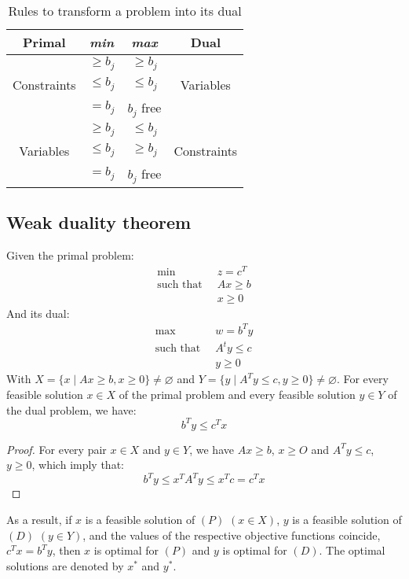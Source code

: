 \begin{table}[H]
    \centering
    \begin{tabular}{c|c|c|c}
        \textbf{Primal} & \textit{min} & \textit{max} & \textbf{Dual} \\ \hline
                    & $\geq b_j$    & $\geq b_j$            & \\ 
        Constraints & $\leq b_j$    & $\leq b_j$            & Variables\\ 
                    & $= b_j$       & $b_j$ free            & \\ \hline
                    & $\geq b_j$    & $\leq b_j$            & \\ 
        Variables   & $\leq b_j$    & $\geq b_j$            & Constraints \\ 
                    & $= b_j$       & $b_j$ free            & \\ 
    \end{tabular}
    \caption{Rules to transform a problem into its dual}
\end{table}

\subsection{Weak duality theorem}
\begin{theorem}
    Given the primal problem: 
    \begin{align*}
        \min                      \:&\: z=c^T            \\
        \text{such that }     &\: Ax\geq b         \\
                                    &\: x \geq 0
    \end{align*}
    And its dual: 
    \begin{align*}
        \max                      \:&\: w=b^Ty              \\
        \text{such that }     &\: A^ty\leq c          \\
                                    &\: y \geq 0
    \end{align*}
    With $X=\{x\mid Ax \geq b, x \geq 0\} \neq \varnothing$ and $Y=\{y\mid A^Ty \leq c, y \geq 0\} \neq \varnothing$.
    For every feasible solution $x \in X$ of the primal problem and every feasible solution $y \in Y$ of the dual problem, we have: 
    \[b^Ty \leq c^Tx\]
\end{theorem}
\begin{proof}
    For every pair $x \in X$ and $y \in Y$, we have $Ax \geq b$, $x \geq O$ and $A^Ty \leq c$, $y \geq 0$, which imply that: 
    \[b^Ty \leq x^TA^Ty \leq x^Tc=c^Tx\]
\end{proof}
As a result, if $x$ is a feasible solution of $(P)$ $(x \in X)$, $y$ is a feasible solution of $(D)$ $(y \in Y)$, and the values of the respective objective functions coincide, $c^Tx=b^Ty$, then $x$ is optimal for $(P)$ and $y$ is optimal for $(D)$.
The optimal solutions are denoted by $x^{\ast}$ and $y^{\ast}$. 

